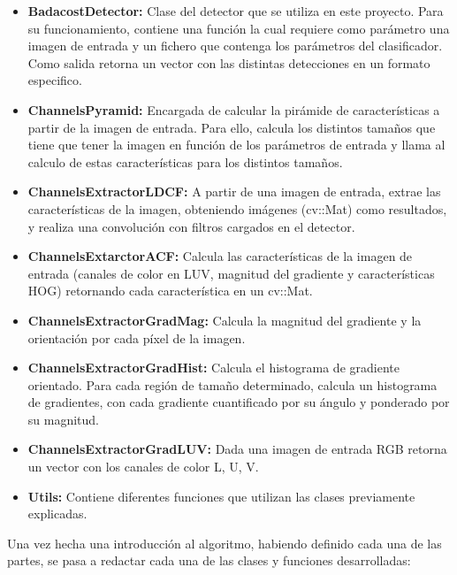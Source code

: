 \begin{itemize}

\item \textbf{BadacostDetector: } Clase del detector que se utiliza en este proyecto. Para su funcionamiento, contiene una función la cual requiere como parámetro una imagen de entrada y un fichero que contenga los parámetros del clasificador. Como salida retorna un vector con las distintas detecciones en un formato especifico.

\item \textbf{ChannelsPyramid: } Encargada de calcular la pirámide de características a partir de la imagen de entrada. Para ello, calcula los distintos tamaños que tiene que tener la imagen en función de los parámetros de entrada y llama al calculo de estas características para los distintos tamaños.

\item \textbf{ChannelsExtractorLDCF: } A partir de una imagen de entrada, extrae las características de la imagen, obteniendo imágenes (cv::Mat) como resultados, y realiza una convolución con filtros cargados en el detector.

\item \textbf{ChannelsExtarctorACF: } Calcula las características de la imagen de entrada (canales de color en LUV, magnitud del gradiente y características HOG) retornando cada característica en un cv::Mat.

\item \textbf{ChannelsExtractorGradMag: } Calcula la magnitud del gradiente y la orientación por cada píxel de la imagen.

\item \textbf{ChannelsExtractorGradHist: } Calcula el histograma de gradiente orientado. Para cada región de tamaño determinado, calcula un histograma de gradientes, con cada gradiente cuantificado por su ángulo y ponderado por su magnitud.

\item \textbf{ChannelsExtractorGradLUV: } Dada una imagen de entrada RGB retorna un vector con los canales de color L, U, V. 

\item \textbf{Utils: } Contiene diferentes funciones que utilizan las clases previamente explicadas.

\end{itemize}

Una vez hecha una introducción al algoritmo, habiendo definido cada una de las partes, se pasa a redactar cada una de las clases y funciones desarrolladas:






















